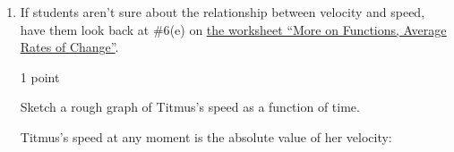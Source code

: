 \documentclass{article}
\makeatletter
\let\@href=\href
\renewcommand{\href}[2]{\@href{#1}{\ul{#2}}}
\makeatother
\begin{document}
\begin{enumerate}
\begin{enumerate}
    \begin{solution}
      Since average acceleration is the average rate of change of velocity, we're just looking for an interval $[a, b]$ where the average rate of change of graph (B) is negative. This is true as long as the average velocity at time $b$ is lower than the average velocity at time $a$. Here's one example; the average acceleration is the slope of the secant line between times $a$ and $b$ (shown in pink).
      \begin{center}
      \end{center}
    \end{solution}

  \item

    \begin{workshop}
      If students aren't sure about the relationship between velocity
      and speed, have them look back at
      {{{{\#6}}(e)}} on \href{https://people.math.harvard.edu/~jjchen/mathma/docs/worksheets/worksheet03-sols.html}{the worksheet ``More on Functions, Average Rates of Change''}. 
    \end{workshop}

    \begin{grading}
      1 point
    \end{grading}

    \begin{problem}[\nstretch{2}]
      Sketch a rough graph of Titmus's speed as a function of time. 
    \end{problem}

    \begin{solution}
      Titmus's speed at any moment is the absolute value of her velocity:
      \begin{center}
      \end{center}
    \end{solution}


\end{enumerate}
\end{enumerate}
\end{document}
